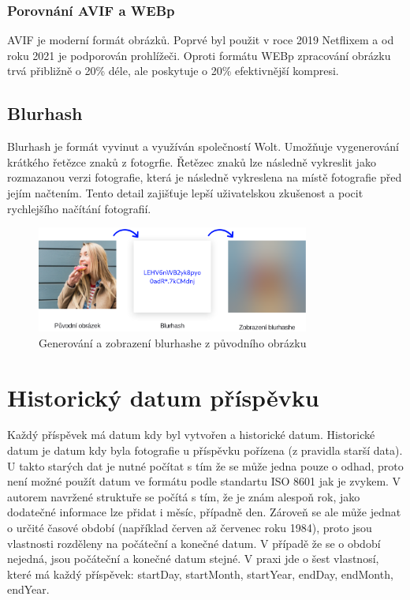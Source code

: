 \documentclass[12pt, a4paper,
 twoside,        %
 openright
]{report}
\begin{document}
\subsubsection{Porovnání AVIF a WEBp}
AVIF je moderní formát obrázků. Poprvé byl použit v roce 2019 Netflixem a od roku 2021 je podporován prohlížeči. Oproti formátu WEBp zpracování obrázku trvá přibližně o 20\% déle, ale poskytuje o 20\% efektivnější kompresi.

\subsection{Blurhash}\label{subsection:blurhash}
Blurhash je formát vyvinut a využíván společností Wolt. Umožňuje vygenerování krátkého řetězce znaků z fotogrfie.
Řetězec znaků lze následně vykreslit jako rozmazanou verzi fotografie, která je následně vykreslena na místě fotografie před jejím načtením.
Tento detail zajišťuje lepší uživatelskou zkušenost a pocit rychlejšího načítání fotografií. \cite{blurhash}\cite{blurhashWoltBlog}

\begin{figure}[h]
	\centering
	\includegraphics[width=0.8\textwidth]{images/blurhash.png}
	\caption{Generování a zobrazení blurhashe z původního obrázku}
\end{figure}
	
\section{Historický datum příspěvku}\label{section:historical_date}
Každý příspěvek má datum kdy byl vytvořen a historické datum. Historické datum je datum kdy byla fotografie u příspěvku pořízena (z pravidla starší data). U takto starých dat je nutné počítat s tím že se může jedna pouze o odhad, proto není možné použít datum ve formátu podle standartu ISO 8601 jak je zvykem. V autorem navržené struktuře se počítá s tím, že je znám alespoň rok, jako dodatečné informace lze přidat i měsíc, případně den. Zároveň se ale může jednat o určité časové období (například červen až červenec roku 1984), proto jsou vlastnosti rozděleny na počáteční a konečné datum. V případě že se o období nejedná, jsou počáteční a konečné datum stejné. V praxi jde o šest vlastnosí, které má každý příspěvek: startDay, startMonth, startYear, endDay, endMonth, endYear.
\end{document}
